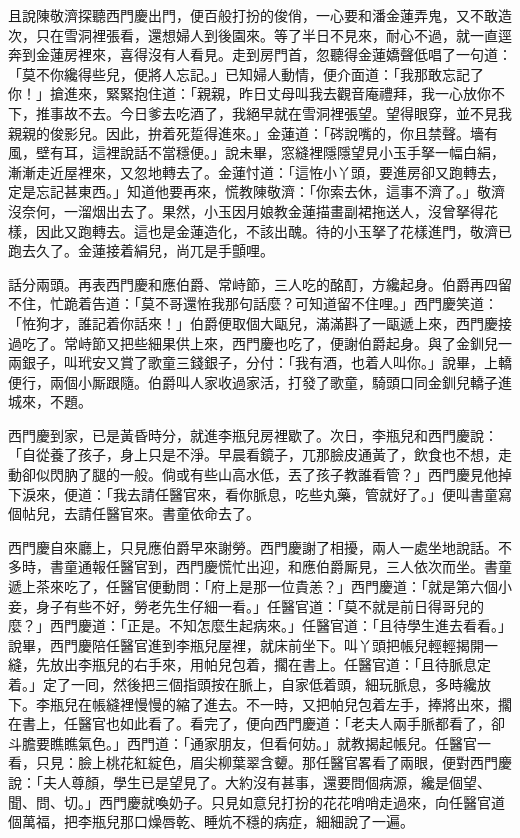 且說陳敬濟探聽西門慶出門，便百般打扮的俊俏，一心要和潘金蓮弄鬼，又不敢造次，只在雪洞裡張看，還想婦人到後園來。等了半日不見來，耐心不過，就一直逕奔到金蓮房裡來，喜得沒有人看見。走到房門首，忽聽得金蓮嬌聲低唱了一句道：「莫不你纔得些兒，便將人忘記。」{}已知婦人動情，便介面道：「我那敢忘記了你！」搶進來，緊緊抱住道：「親親，昨日丈母叫我去觀音庵禮拜，我一心放你不下，推事故不去。今日爹去吃酒了，我絕早就在雪洞裡張望。望得眼穿，並不見我親親的俊影兒。{}因此，拚着死踅得進來。」金蓮道：「硶說嘴的，你且禁聲。墻有風，壁有耳，這裡說話不當穩便。」說未畢，窓縫裡隱隱望見小玉手拏一幅白絹，漸漸走近屋裡來，又忽地轉去了。金蓮忖道：「這恠小丫頭，要進房卻又跑轉去，定是忘記甚東西。」知道他要再來，慌教陳敬濟：「你索去休，這事不濟了。」敬濟沒奈何，一溜烟出去了。{}果然，小玉因月娘教金蓮描畫副裙拖送人，沒曾拏得花樣，因此又跑轉去。這也是金蓮造化，不該出醜。待的小玉拏了花樣進門，敬濟已跑去久了。金蓮接着絹兒，尚兀是手顫哩。

話分兩頭。再表西門慶和應伯爵、常峙節，三人吃的酩酊，方纔起身。伯爵再四留不住，忙跪着告道：「莫不哥還恠我那句話麼？可知道留不住哩。」西門慶笑道：「恠狗才，誰記着你話來！」伯爵便取個大甌兒，滿滿斟了一甌遞上來，西門慶接過吃了。常峙節又把些細果供上來，西門慶也吃了，便謝伯爵起身。與了金釧兒一兩銀子，叫玳安又賞了歌童三錢銀子，分付：「我有酒，也着人叫你。」說畢，上轎便行，兩個小厮跟隨。伯爵叫人家收過家活，打發了歌童，騎頭口同金釧兒轎子進城來，不題。

西門慶到家，已是黃昏時分，就進李瓶兒房裡歇了。次日，李瓶兒和西門慶說：「自從養了孩子，身上只是不淨。早晨看鏡子，兀那臉皮通黃了，飲食也不想，走動卻似閃肭了腿的一般。倘或有些山高水低，丟了孩子教誰看管？」西門慶見他掉下淚來，便道：「我去請任醫官來，看你脈息，吃些丸藥，管就好了。」便叫書童寫個帖兒，去請任醫官來。書童依命去了。

西門慶自來廳上，只見應伯爵早來謝勞。西門慶謝了相擾，兩人一處坐地說話。不多時，書童通報任醫官到，西門慶慌忙出迎，和應伯爵厮見，三人依次而坐。書童遞上茶來吃了，任醫官便動問：「府上是那一位貴恙？」西門慶道：「就是第六個小妾，身子有些不好，勞老先生仔細一看。」任醫官道：「莫不就是前日得哥兒的麼？」西門慶道：「正是。不知怎麼生起病來。」任醫官道：「且待學生進去看看。」說畢，西門慶陪任醫官進到李瓶兒屋裡，就床前坐下。叫丫頭把帳兒輕輕揭開一縫，先放出李瓶兒的右手來，用帕兒包着，擱在書上。任醫官道：「且待脈息定着。」定了一囘，然後把三個指頭按在脈上，{}自家低着頭，細玩脈息，{}多時纔放下。李瓶兒在帳縫裡慢慢的縮了進去。不一時，又把帕兒包着左手，捧將出來，擱在書上，任醫官也如此看了。看完了，便向西門慶道：「老夫人兩手脈都看了，卻斗膽要瞧瞧氣色。」西門道：「通家朋友，但看何妨。」就教揭起帳兒。{}任醫官一看，只見：臉上桃花紅綻色，眉尖柳葉翠含顰。那任醫官畧看了兩眼，便對西門慶說：「夫人尊顏，學生已是望見了。大約沒有甚事，還要問個病源，纔是個望、聞、問、切。」西門慶就喚奶子。只見如意兒打扮的花花哨哨走過來，向任醫官道個萬福，把李瓶兒那口燥唇乾、睡炕不穩的病症，細細說了一遍。

